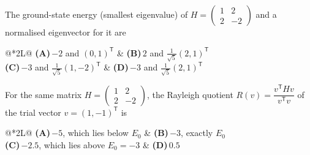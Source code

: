 \documentclass[11pt,a4paper]{article}
\newcommand{\optlabel}[1]{\textbf{(#1)}}
\newenvironment{qitem}[1]{\begin{list}{}{\setlength{\leftmargin}{3.3em}\setlength{\labelwidth}{3.1em}%
  \setlength{\labelsep}{0.2em}\setlength{\topsep}{3pt}\setlength{\parsep}{3pt}}\item[\textbf{Q.#1}\hfill]}{\end{list}}
\newcommand{\qsep}{\par\vspace{2pt}{\color{black!15}\hrule}\vspace{4pt}}
\begin{document}
\begin{qitem}{1}
The ground-state energy (smallest eigenvalue) of $H = \begin{pmatrix}1 & 2\\ 2 & -2\end{pmatrix}$ and a normalised eigenvector for it are
\par\smallskip\noindent\begin{tabularx}{\linewidth}{@{}*{2}{L}@{}}
\optlabel{A}\,$-2$ and $(0, 1)^{\mathsf T}$ & \optlabel{B}\,$2$ and $\tfrac{1}{\sqrt5}(2, 1)^{\mathsf T}$ \\[3pt]
\optlabel{C}\,$-3$ and $\tfrac{1}{\sqrt5}(1, -2)^{\mathsf T}$ & \optlabel{D}\,$-3$ and $\tfrac{1}{\sqrt5}(2, 1)^{\mathsf T}$
\end{tabularx}
\end{qitem}
\qsep

\begin{qitem}{2}
For the same matrix $H = \begin{pmatrix}1 & 2\\ 2 & -2\end{pmatrix}$, the Rayleigh quotient $R(v) = \dfrac{v^{\mathsf T}Hv}{v^{\mathsf T}v}$ of the trial
vector $v = (1, -1)^{\mathsf T}$ is
\par\smallskip\noindent\begin{tabularx}{\linewidth}{@{}*{2}{L}@{}}
\optlabel{A}\,$-5$, which lies below $E_0$ & \optlabel{B}\,$-3$, exactly $E_0$ \\[3pt]
\optlabel{C}\,$-2.5$, which lies above $E_0 = -3$ & \optlabel{D}\,$0.5$
\end{tabularx}
\end{qitem}
\qsep
\end{document}
